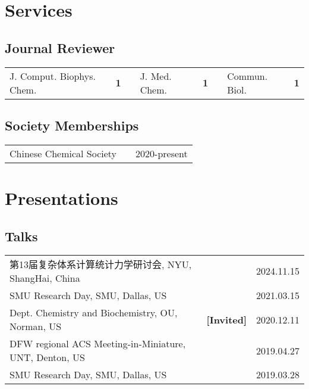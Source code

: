 \documentclass{article}
\begin{document}
\section*{Services}
\subsection*{Journal Reviewer}
\begin{tabularx}{\linewidth}{l|>{\bf}rX l|>{\bf}rX l|>{\bf}r}
  J. Comput. Biophys. Chem. &  1  && J. Med. Chem. &  1  &&  Commun. Biol. & 1  \\
\end{tabularx}
\subsection*{Society Memberships}
\begin{tabularx}{\linewidth}{lXr}
  Chinese Chemical Society & & 2020-present \\
\end{tabularx}

\section*{Presentations}
\subsection*{Talks}
\begin{tabularx}{\linewidth}{X>{\bf\color{myred}}lr}
第13届复杂体系计算统计力学研讨会, NYU, ShangHai, China       &           & 2024.11.15 \\
SMU Research Day, SMU, Dallas, US                       &           & 2021.03.15 \\
Dept. Chemistry and Biochemistry, OU, Norman, US        & [Invited] & 2020.12.11 \\
DFW regional ACS Meeting-in-Miniature, UNT, Denton, US  &           & 2019.04.27 \\
SMU Research Day, SMU, Dallas, US                       &           & 2019.03.28 \\
\end{tabularx}
\end{document}
